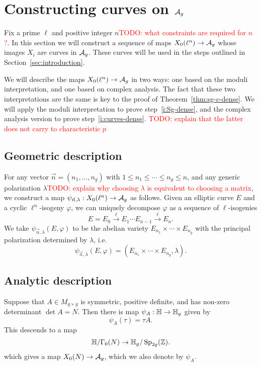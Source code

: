\documentclass{amsart}
\begin{document}
\section{Constructing curves on $\mathcal{A}_g$}
\label{sec:curves-on-Ag}

Fix a prime $\ell$ and positive integer $n$\textcolor{red}{TODO: what constraints are required for $n$?}. In this section we will construct a sequence of maps $X_0(\ell^n) \to \mathcal{A}_g$ whose images $X_i$ are curves in $\mathcal{A}_g$. These curves will be used in the steps outlined in Section~\ref{sec:introduction}.

We will describe the maps $X_0(\ell^n) \to \mathcal{A}_g$ in two ways: one based on the moduli interpretation, and one based on complex analysis. The fact that these two interpretations are the same is key to the proof of Theorem~\ref{thm:sg-c-dense}. We will apply the moduli interpretation to prove step~\ref{i:Sg-dense}, and the complex analysis version to prove step~\ref{i:curves-dense}. \textcolor{red}{TODO: explain that the latter does not carry to characteristic $p$}

\subsection{Geometric description}
\label{sec:geo-desc}

For any vector $\vec{n} = (n_1,\dots,n_g)$ with $1 \leq n_1 \leq \cdots \leq n_g \leq n$, and any generic polarization $\lambda$\textcolor{red}{TODO: explain why choosing $\lambda$ is equivalent to choosing a matrix}, we construct a map $\psi_{\vec{n},\lambda}: X_0(\ell^n) \to \mathcal{A}_g$ as follows. Given an elliptic curve $E$ and a cyclic $\ell^n$-isogeny $\varphi$, we can uniquely decompose $\varphi$ as a sequence of $\ell$-isogenies
\[
  E = E_0 \xrightarrow{\ell} E_1 \cdots E_{n-1} \xrightarrow{\ell} E_n.
\]
We take $\psi_{\vec{n},\lambda}(E,\varphi)$ to be the abelian variety $E_{n_1} \times \cdots \times E_{n_g}$ with the principal polarization determined by $\lambda$, i.e.
\begin{equation}\label{def:psi-n-lambda}
  \psi_{\vec{n},\lambda}(E,\varphi) = (E_{n_1} \times \cdots \times E_{n_g}, \lambda).
\end{equation}

\subsection{Analytic description}
\label{sec:ana-desc}

Suppose that $A \in M_{g \times g}$ is symmetric, positive definite, and has non-zero determinant $\det A = N$. Then there is map $\psi_A: \mathbb{H} \to \mathbb{H}_g$ given by
\[
  \psi_A(\tau) = \tau A.
\]
This descends to a map
\begin{equation}\label{def:psi-A-n}
  \mathbb{H}/\Gamma_0(N) \to \mathbb{H}_g/\operatorname{Sp}_{2g}(\mathbb{Z}).
\end{equation}
which gives a map $X_0(N) \to \mathcal{A}_g$, which we also denote by $\psi_{A}$.
\end{document}
